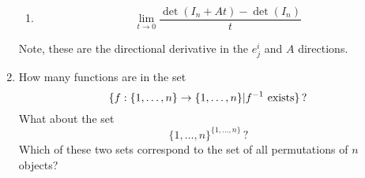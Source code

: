 \begin{enumerate}
\begin{enumerate}
\item \[
\lim_{t \rightarrow 0} \frac{\det(I_n + A t) - \det(I_n)}{t}
\]
\end{enumerate}
Note, these  are the directional derivative in the $e^i_j$ and $A$ directions.


\item How many functions are in the set \[\{ f:\{1,\dots,n\}\to \{1,\dots,n\} | f^{-1} {\rm ~exists} \}\, ?\] What about the set \[\{1,\dots,n\}^{\{1,\dots,n\}}\, ?\] Which of these two sets correspond to the set of all permutations of $n$ objects?


\end{enumerate}
